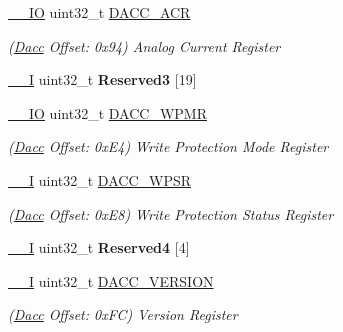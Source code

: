 \begin{DoxyCompactItemize}
\item 
\mbox{\label{structDacc_a723e7b1c3acf89bfd9e92ed169c7fdf5}} 
\mbox{\hyperlink{core__cm7_8h_aec43007d9998a0a0e01faede4133d6be}{\+\_\+\+\_\+\+IO}} uint32\+\_\+t \mbox{\hyperlink{structDacc_a723e7b1c3acf89bfd9e92ed169c7fdf5}{D\+A\+C\+C\+\_\+\+A\+CR}}
\begin{DoxyCompactList}\small\item\em (\mbox{\hyperlink{structDacc}{Dacc}} Offset\+: 0x94) Analog Current Register \end{DoxyCompactList}\item 
\mbox{\label{structDacc_a46bb361938bcfc7f8527b9e6e30e7423}} 
\mbox{\hyperlink{core__cm7_8h_af63697ed9952cc71e1225efe205f6cd3}{\+\_\+\+\_\+I}} uint32\+\_\+t {\bfseries Reserved3} \mbox{[}19\mbox{]}
\item 
\mbox{\label{structDacc_ae5deaa688b44a8ad9d11524ca4e6a560}} 
\mbox{\hyperlink{core__cm7_8h_aec43007d9998a0a0e01faede4133d6be}{\+\_\+\+\_\+\+IO}} uint32\+\_\+t \mbox{\hyperlink{structDacc_ae5deaa688b44a8ad9d11524ca4e6a560}{D\+A\+C\+C\+\_\+\+W\+P\+MR}}
\begin{DoxyCompactList}\small\item\em (\mbox{\hyperlink{structDacc}{Dacc}} Offset\+: 0x\+E4) Write Protection Mode Register \end{DoxyCompactList}\item 
\mbox{\label{structDacc_a238d3925d9af596e25cd6810cd2357df}} 
\mbox{\hyperlink{core__cm7_8h_af63697ed9952cc71e1225efe205f6cd3}{\+\_\+\+\_\+I}} uint32\+\_\+t \mbox{\hyperlink{structDacc_a238d3925d9af596e25cd6810cd2357df}{D\+A\+C\+C\+\_\+\+W\+P\+SR}}
\begin{DoxyCompactList}\small\item\em (\mbox{\hyperlink{structDacc}{Dacc}} Offset\+: 0x\+E8) Write Protection Status Register \end{DoxyCompactList}\item 
\mbox{\label{structDacc_a0475bd854e64711851435b47cba3caed}} 
\mbox{\hyperlink{core__cm7_8h_af63697ed9952cc71e1225efe205f6cd3}{\+\_\+\+\_\+I}} uint32\+\_\+t {\bfseries Reserved4} \mbox{[}4\mbox{]}
\item 
\mbox{\label{structDacc_aacbb697d97cb840b888acfdea2a88580}} 
\mbox{\hyperlink{core__cm7_8h_af63697ed9952cc71e1225efe205f6cd3}{\+\_\+\+\_\+I}} uint32\+\_\+t \mbox{\hyperlink{structDacc_aacbb697d97cb840b888acfdea2a88580}{D\+A\+C\+C\+\_\+\+V\+E\+R\+S\+I\+ON}}
\begin{DoxyCompactList}\small\item\em (\mbox{\hyperlink{structDacc}{Dacc}} Offset\+: 0x\+FC) Version Register \end{DoxyCompactList}\end{DoxyCompactItemize}


